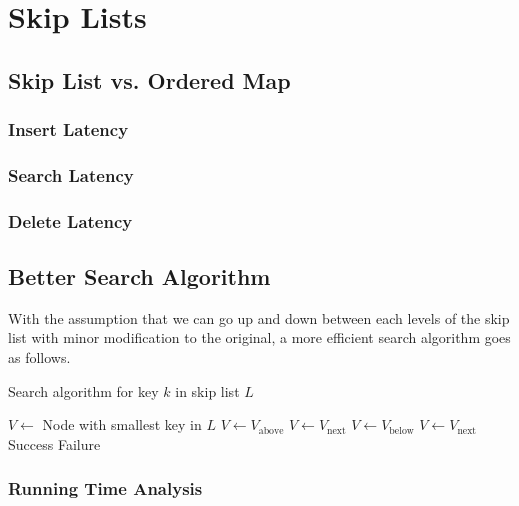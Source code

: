 \section{Skip Lists}

\subsection{Skip List vs. Ordered Map}

\subsubsection{Insert Latency}
\subsubsection{Search Latency}
\subsubsection{Delete Latency}

\subsection{Better Search Algorithm}

With the assumption that we can go up and down between each levels of the skip list with minor modification to the original, a more efficient search algorithm goes as follows.

\begin{algorithm}
\caption{Search algorithm for key $k$ in skip list $L$}
\begin{algorithmic}[1]
	\State $V \gets$ Node with smallest key in $L$
	 
			\State $V \gets V_\text{above}$
		\EndWhile
		\State $V \gets V_\text{next}$
	\EndWhile
	 
		\State $V \gets V_\text{below}$
			\State $V \gets V_\text{next}$
		\EndWhile
	\EndWhile
		\State \Return Success
	\Else
		\State \Return Failure
	\EndIf
\EndProcedure
\end{algorithmic}
\end{algorithm}

\subsubsection{Running Time Analysis}

